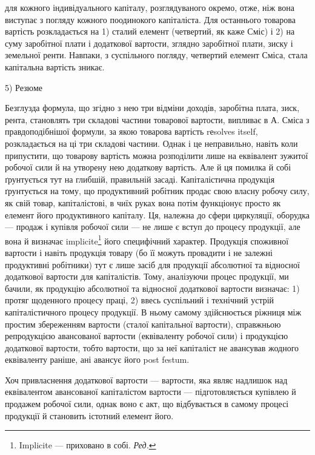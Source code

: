 \parcont{}  %
для кожного індивідуального капіталу, розглядуваного окремо, отже, ніж
вона виступає з погляду кожного поодинокого капіталіста. Для останнього
товарова вартість розкладається на 1) сталий елемент (четвертий,
як каже Сміс) і 2) на суму заробітної плати і додаткової вартости, зглядно
заробітної плати, зиску і земельної ренти. Навпаки, з суспільного погляду,
четвертий елемент Сміса, стала капітальна вартість зникає.

5) Резюме

Безглузда формула, що згідно з нею три відміни доходів, заробітна
плата, зиск, рента, становлять три складові частини товарової вартости,
випливає в А. Сміса з правдоподібнішої формули, за якою товарова
вартість rеsolves itself, розкладається на ці три складові частини. Однак
і це неправильно, навіть коли припустити, що товарову вартість можна
розподілити лише на еквівалент зужитої робочої сили й на утворену
нею додаткову вартість. Але й ця помилка й собі ґрунтується тут на
глибшій, правильній засаді. Капіталістична продукція ґрунтується на тому,
що продуктивний робітник продає свою власну робочу силу, як свій
товар, капіталістові, в чиїх руках вона потім функціонує просто як елемент
його продуктивного капіталу. Ця, належна до сфери циркуляції,
оборудка — продаж і купівля робочої сили — не лише є вступ до процесу
продукції, але вона й визначає implicite\footnote*{
Implicite — приховано в собі. \emph{Ред.}
} його специфічний характер.
Продукція споживної вартости і навіть продукція товару (бо її можуть
провадити і не залежні продуктивні робітники) тут є лише засіб для продукції
абсолютної та відносної додаткової вартости для капіталістів. Тому, аналізуючи
процес продукції, ми бачили, як продукцію абсолютної та відносної
додаткової вартости визначає: 1) протяг щоденного процесу праці,
2) ввесь суспільний і технічний устрій капіталістичного процесу продукції.
В ньому самому здійснюється ріжниця між простим збереженням вартости
(сталої капітальної вартости), справжньою репродукцією авансованої вартости
(еквіваленту робочої сили) і продукцією додаткової вартости, тобто
вартости, що за неї капіталіст не авансував жодного еквіваленту раніше,
ані авансує його post festum.

Хоч привласнення додаткової вартости — вартости, яка являє надлишок
над еквівалентом авансованої капіталістом вартости — підготовляється
купівлею й продажем робочої сили, однак воно є акт, що відбувається
в самому процесі продукції й становить істотний елемент його.

